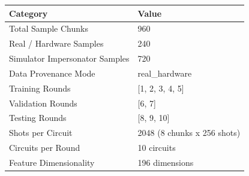 \begin{tabular}{ll}
\toprule
Category & Value \\
\midrule
Total Sample Chunks & 960 \\
Real / Hardware Samples & 240 \\
Simulator Impersonator Samples & 720 \\
Data Provenance Mode & real_hardware \\
Training Rounds & [1, 2, 3, 4, 5] \\
Validation Rounds & [6, 7] \\
Testing Rounds & [8, 9, 10] \\
Shots per Circuit & 2048 (8 chunks x 256 shots) \\
Circuits per Round & 10 circuits \\
Feature Dimensionality & 196 dimensions \\
\bottomrule
\end{tabular}

